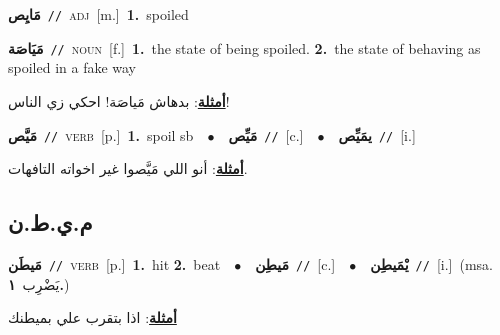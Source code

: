 \documentclass[10pt,a4paper,twoside]{article} %
\begin{document}
\begin{multicols}{2}
{\setlength\topsep{0pt}\textbf{\foreignlanguage{arabic}{مَايِص}}\ {\color{gray}\texttt{//}\color{black}}\ \textsc{adj}\ [m.]\ \textbf{1.}~spoiled\ } \vspace{2mm}

{\setlength\topsep{0pt}\textbf{\foreignlanguage{arabic}{مَيَاصَة}}\ {\color{gray}\texttt{//}\color{black}}\ \textsc{noun}\ [f.]\ \textbf{1.}~the state of being spoiled.  \textbf{2.}~the state of behaving as spoiled in a fake way\  \begin{flushright}\color{gray}\foreignlanguage{arabic}{\textbf{\underline{\foreignlanguage{arabic}{أمثلة}}}: بدهاش مَياصَة! احكي زي الناس!}\end{flushright}\color{black}} \vspace{2mm}

{\setlength\topsep{0pt}\textbf{\foreignlanguage{arabic}{مَيَّص}}\ {\color{gray}\texttt{//}\color{black}}\ \textsc{verb}\ [p.]\ \textbf{1.}~spoil sb\ \ $\bullet$\ \ \setlength\topsep{0pt}\textbf{\foreignlanguage{arabic}{مَيِّص}}\ {\color{gray}\texttt{//}\color{black}}\ [c.]\ \ $\bullet$\ \ \setlength\topsep{0pt}\textbf{\foreignlanguage{arabic}{يمَيِّص}}\ {\color{gray}\texttt{//}\color{black}}\ [i.]\  \begin{flushright}\color{gray}\foreignlanguage{arabic}{\textbf{\underline{\foreignlanguage{arabic}{أمثلة}}}: أنو اللي مَيَّصوا غير اخواته التافهات.}\end{flushright}\color{black}} \vspace{2mm}

\vspace{-3mm}
\subsection*{\color{blue}\foreignlanguage{arabic}{م.ي.ط.ن}\color{blue}{}} 

{\setlength\topsep{0pt}\textbf{\foreignlanguage{arabic}{مَيطَن}}\ {\color{gray}\texttt{//}\color{black}}\ \textsc{verb}\ [p.]\ \textbf{1.}~hit  \textbf{2.}~beat\ \ $\bullet$\ \ \setlength\topsep{0pt}\textbf{\foreignlanguage{arabic}{مَيطِن}}\ {\color{gray}\texttt{//}\color{black}}\ [c.]\ \ $\bullet$\ \ \setlength\topsep{0pt}\textbf{\foreignlanguage{arabic}{يْمَيطِن}}\ {\color{gray}\texttt{//}\color{black}}\ [i.]\ \color{gray}(msa. \foreignlanguage{arabic}{يَضْرِب}~\foreignlanguage{arabic}{\textbf{١.}})\color{black}\  \begin{flushright}\color{gray}\foreignlanguage{arabic}{\textbf{\underline{\foreignlanguage{arabic}{أمثلة}}}: اذا بتقرب علي بميطنك}\end{flushright}\color{black}} \vspace{2mm}


\end{multicols}
\end{document}
